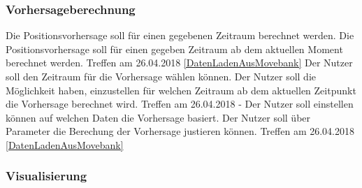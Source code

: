 \documentclass[12pt]{article} %
\begin{document}
\subsubsection{Vorhersageberechnung}

\begin{requirements}[ref={(R\arabic*)},label=(R\arabic*),resume]
{
 Die Positionsvorhersage soll für einen gegebenen Zeitraum berechnet werden. 
 }{
 Die Positionsvorhersage soll für einen gegeben Zeitraum ab dem aktuellen Moment berechnet werden. 
 }{
 Treffen am 26.04.2018 
 }{
 \ref{DatenLadenAusMovebank} 
}
{
 Der Nutzer soll den Zeitraum für die Vorhersage wählen können.
 }{
 Der Nutzer soll die Möglichkeit haben, einzustellen für welchen Zeitraum ab dem aktuellen Zeitpunkt die Vorhersage berechnet wird. 
 }{
 Treffen am 26.04.2018
 }{
 - 
}
{
 Der Nutzer soll einstellen können auf welchen Daten die Vorhersage basiert.
 }{
 Der Nutzer soll über Parameter die Berechung der Vorhersage justieren können.}{
 Treffen am 26.04.2018
 }{
 \ref{DatenLadenAusMovebank} 
}
\end{requirements}

\subsubsection{Visualisierung}
\end{document}
